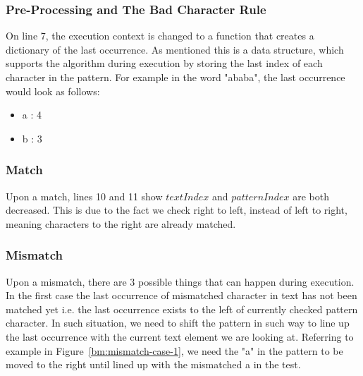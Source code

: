 \subsubsection{Pre-Processing and The Bad Character Rule} On line 7, the execution context is changed to a function that creates a dictionary of the last occurrence. As mentioned this is a data structure, which supports the algorithm during execution by storing the last index of each character in the pattern. For example in the word "ababa", the last occurrence would look as follows:
\begin{itemize}
    \item{a : 4}
    \item{b : 3}
\end{itemize}


\subsubsection{Match} Upon a match, lines 10 and 11 show $textIndex$ and $patternIndex$ are both decreased. This is due to the fact we check right to left, instead of left to right, meaning characters to the right are already matched.

\subsubsection{Mismatch} Upon a mismatch, there are 3 possible things that can happen during execution.  In the first case the last occurrence of mismatched character in text has not been matched yet i.e. the last occurrence exists to the left of currently checked pattern character. In such situation, we need to shift the pattern in such way to line up the last occurrence with the current text element we are looking at.  Referring to example in Figure~\ref{bm:mismatch-case-1}, we need the "a" in the pattern to be moved to the right until lined up with the mismatched a in the test.

